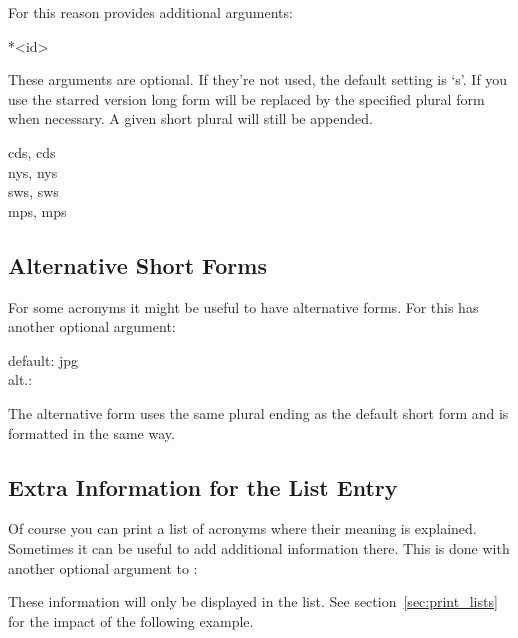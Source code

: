 \documentclass[DIV10,toc=index,toc=bib]{cnpkgdoc}
\begin{document}
For this reason  provides additional arguments:
\begin{beschreibung}
 *{<id>}
\end{beschreibung}
These arguments are optional. If they're not used, the default setting is `s'.
If you use the starred version long form will be replaced by the specified plural
form when necessary. A given short plural will still be appended.

\begin{beispiel}
 \acsp{cd}, \aclp{cd} \\
 \acsp{ny}, \aclp{ny} \\
 \acsp{sw}, \aclp{sw} \\
 \acsp{mp}, \aclp{mp}
\end{beispiel}

\subsection{Alternative Short Forms}
For some acronyms it might be useful to have alternative forms. For this
 has another optional argument:
\begin{beschreibung}
\end{beschreibung}
\begin{beispiel}
 default: \acs{jpg} \\
 alt.: 
\end{beispiel}
The alternative form uses the same plural ending as the default short form and
is formatted in the same way.

\subsection{Extra Information for the List Entry}
Of course you can print a list of acronyms where their meaning is explained.
Sometimes it can be useful to add additional information there. This is done with
another optional argument to :
\begin{beschreibung}
\end{beschreibung}
These information will only be displayed in the list. See section~\ref{sec:print_lists}
for the impact of the following example.
\end{document}
